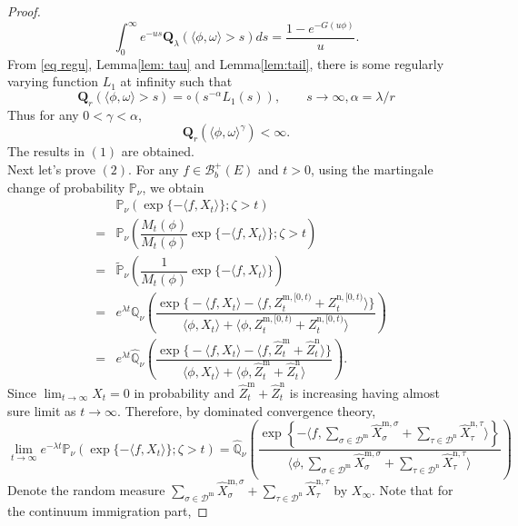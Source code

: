 \documentclass[12pt,a4paper]{amsart}
\numberwithin{equation}{section}
\theoremstyle{plain}
\theoremstyle{definition}
\theoremstyle{remark}
\begin{document}
\begin{proof}
\[
\int_0^\infty e^{-us}{\mathbf Q}_\lambda(\langle\phi,\omega\rangle>s)ds=\dfrac{1-e^{-G(u\phi)}}{u}.
\]
From \eqref{eq regu}, Lemma\ref{lem: tau} and Lemma\ref{lem:tail}, there is some regularly varying function $L_1$ at infinity such that
\begin{equation}
{\mathbf Q}_r(\langle\phi,\omega\rangle>s)=\circ(s^{-\alpha}L_1(s)),\qquad s\to\infty, \alpha=\lambda/r
\end{equation}
Thus for any $0<\gamma<\alpha$,
\[
{\mathbf Q}_r\left(\langle\phi,\omega\rangle^{\gamma}\right)<\infty.
\]
The results in $(1)$ are obtained. \\
 Next let's prove $(2)$.  For any $f\in\mathcal B_b^+(E)$ and $t>0$, using the martingale change of probability $\mathbb P_\nu$, we obtain
\begin{eqnarray*}
&&\mathbb P_\nu\left(\exp\{-\langle f, X_t\rangle \};\zeta>t\right)\\
&=&\mathbb P_\nu\left(\dfrac{M_t(\phi)}{M_t(\phi)}\exp\{-\langle f, X_t\rangle \};\zeta>t\right)\\
&=&\widetilde{\mathbb P}_\nu\left(\dfrac{1}{M_t(\phi)}\exp\{-\langle f, X_t\rangle \}\right)\\
&=&e^{\lambda t}\mathbb Q_{\nu}\left(\dfrac{\exp\Big\{-\langle f, X_t\rangle -\langle f,  Z^{\mathrm m, [0,t)}_t+ Z^{\mathrm n, [0,t)}_t\rangle\Big \}}{\langle\phi, X_t\rangle +\langle\phi,  Z^{\mathrm m, [0,t)}_t+ Z^{\mathrm n, [0,t)}_t\rangle }\right)\\
&=&e^{\lambda t}\widehat{\mathbb Q}_{\nu}\left(\dfrac{\exp\Big\{-\langle f, X_t\rangle -\langle f,  \widehat Z^{\mathrm m}_t+ \widehat Z^{\mathrm n}_t\rangle\Big \}}{\langle\phi, X_t\rangle +\langle\phi,  \widehat Z^{\mathrm m}_t+ \widehat Z^{\mathrm n}_t\rangle }
\right).
\end{eqnarray*}
Since $\lim_{t\rightarrow\infty}X_t=0$ in probability and $\widehat Z^{\mathrm m}_t+ \widehat Z^{\mathrm n}_t$ is increasing having almost sure limit as $t\to\infty$.  Therefore, by dominated convergence theory,
\[
\lim_{t\to\infty}e^{-\lambda t}\mathbb P_\nu\left(\exp\{-\langle f, X_t\rangle \};\zeta>t\right)=\widehat{\mathbb Q}_{\nu}\left(\dfrac{\exp\left\{-\langle f,\sum_{\sigma\in\mathcal D^{\mathrm m}}\widehat X^{{\mathrm m},\sigma}_\sigma+\sum_{\tau\in\mathcal D^{\mathrm n}}\widehat X^{{\mathrm n},\tau}_\tau\rangle \right\}}{\langle \phi,\sum_{\sigma\in\mathcal D^{\mathrm m}}\widehat X^{{\mathrm m},\sigma}_\sigma+\sum_{\tau\in\mathcal D^{\mathrm n}}\widehat X^{{\mathrm n},\tau}_\tau\rangle}\right)
\]
Denote the random measure $\sum_{\sigma\in\mathcal D^{\mathrm m}}\widehat X^{{\mathrm m},\sigma}_\sigma+\sum_{\tau\in\mathcal D^{\mathrm n}}\widehat X^{{\mathrm n},\tau}_\tau$ by $X_\infty$.  Note that for the continuum immigration part,

\end{proof}
\end{document}

